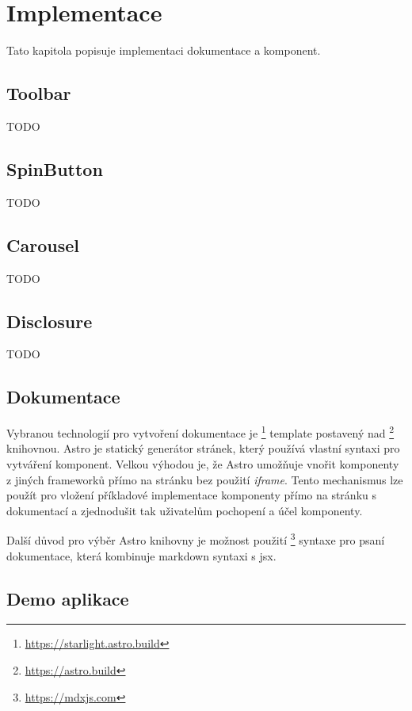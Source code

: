 \chapter{Implementace}

Tato kapitola popisuje implementaci dokumentace a komponent.

\section{Toolbar}

TODO

\section{SpinButton}

TODO

\section{Carousel}

TODO

\section{Disclosure}

TODO

\section{Dokumentace}

Vybranou technologií pro vytvoření dokumentace je \footnote{\url{https://starlight.astro.build}} template postavený nad \footnote{\url{https://astro.build}} knihovnou.
Astro je statický generátor stránek, který používá vlastní syntaxi pro vytváření komponent.
Velkou výhodou je, že Astro umožňuje vnořit komponenty z jiných frameworků přímo na stránku bez použití \textit{iframe}.
Tento mechanismus lze použít pro vložení příkladové implementace komponenty přímo na stránku s dokumentací a zjednodušit tak uživatelům pochopení a účel komponenty.

Další důvod pro výběr Astro knihovny je možnost použití \footnote{\url{https://mdxjs.com}} syntaxe pro psaní dokumentace, která kombinuje markdown syntaxi s \gls{jsx}.

\section{Demo aplikace}

